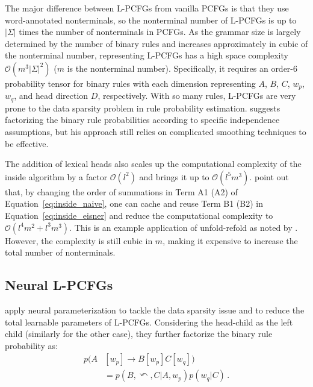 \documentclass[11pt,a4paper]{article}
\begin{document}
The major difference between L-PCFGs from vanilla PCFGs is that they use word-annotated nonterminals,
so the nonterminal number of L-PCFGs is up to $|\Sigma|$ times the number of nonterminals in PCFGs.
As the grammar size is largely determined by the number of binary rules 
and increases approximately in cubic of the nonterminal number,
representing L-PCFGs has a high space complexity $\mathcal{O}(m^{3}|\Sigma|^2)$ ($m$ is the nonterminal number).
Specifically, it requires an order-6 probability tensor for binary rules with each dimension representing $A$, $B$, $C$, $w_p$, $w_q$, and head direction $D$, respectively.
With so many rules,
L-PCFGs are very prone to the data sparsity problem in rule probability estimation. \citet{collins-2003-head} suggests factorizing the binary rule probabilities according to specific independence assumptions,
but his approach still relies on complicated smoothing techniques to be effective. 



The addition of lexical heads also scales up the computational complexity of the inside algorithm by a factor $\mathcal{O}(l^2)$ and brings it up to $\mathcal{O}(l^{5} m^{3})$.
\citet{eisner-satta-1999-efficient} point out that,
by changing the order of summations in Term A1 (A2) of Equation~\ref{eq:inside_naive},
one can cache and reuse Term B1 (B2) in Equation~\ref{eq:inside_eisner} and reduce the computational complexity to $\mathcal{O}(l^4m^2 + l^3m^3)$. This is an example application of unfold-refold as noted by \citet{ eisner-blatz-2007}. 
However, the complexity is still cubic in $m$, making it expensive to increase the total number of nonterminals.




\subsection{Neural L-PCFGs}

\citet{zhu-etal-2020-return} apply neural parameterization to tackle the data sparsity issue and to reduce the total learnable parameters of L-PCFGs. Considering the head-child as the left child (similarly for the other case), they further factorize the binary rule probability as:
\begin{align}
p(A&[w_{p}] \rightarrow B[w_{p}] C[w_{q}]) \nonumber\\
\label{eq:factor_zhu_left_prob}
&=p(B,\curvearrowleft, C | A, w_{p} )  p(w_{q} | C)\,. 
\end{align}
\end{document}
